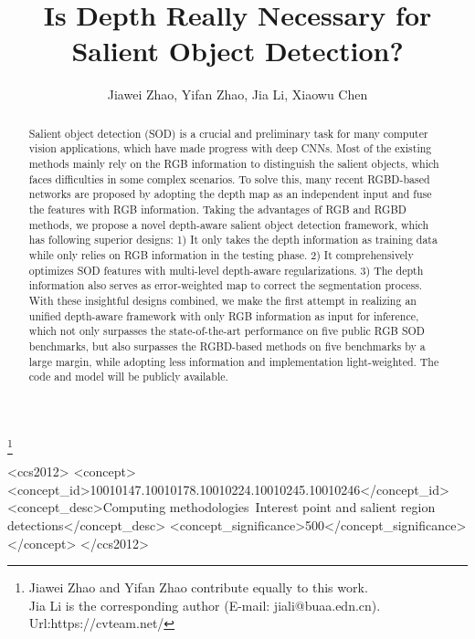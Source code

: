 \documentclass[sigconf]{acmart}
\begin{document}
\fancyhead{}
\title{Is Depth Really Necessary for Salient Object Detection?}




\author{Jiawei Zhao, Yifan Zhao, Jia Li, Xiaowu Chen}
\thanks{Jiawei Zhao and Yifan Zhao contribute equally to this work.\\
Jia Li is the corresponding author (E-mail: \textsuperscript{}jiali@buaa.edn.cn). Url:\textsuperscript{}https://cvteam.net/}














\begin{abstract}
    
	Salient object detection (SOD) is a crucial and preliminary task for many computer vision applications, which have made progress with deep CNNs. Most of the existing methods mainly rely on the RGB information to distinguish the salient objects, which faces difficulties in some complex scenarios. To solve this, many recent RGBD-based networks are proposed by adopting the depth map as an independent input and fuse the features with RGB information. Taking the advantages of RGB and RGBD methods, we propose a novel depth-aware salient object detection framework, which has following superior designs: 1) It only takes the depth information as training data while only relies on RGB information in the testing phase. 2) It comprehensively optimizes SOD features with multi-level depth-aware regularizations. 3) The depth information also serves as error-weighted map to correct the segmentation process. 
	With these insightful designs combined, we make the first attempt in realizing an unified depth-aware framework with only RGB information as input for inference, which not only surpasses the state-of-the-art performance on five public RGB SOD benchmarks, but also surpasses the RGBD-based methods on five benchmarks by a large margin, while adopting less information and implementation light-weighted. The code and model will be publicly available.
\end{abstract}


\begin{CCSXML}
	<ccs2012>
	<concept>
	<concept_id>10010147.10010178.10010224.10010245.10010246</concept_id>
	<concept_desc>Computing methodologies~Interest point and salient region detections</concept_desc>
	<concept_significance>500</concept_significance>
	</concept>
	</ccs2012>
\end{CCSXML}
\end{document}
